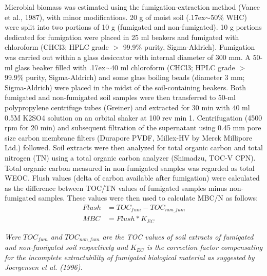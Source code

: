     	Microbial biomass was estimated using the fumigation-extraction method (Vance et al., 1987), with minor modifications. 20 g of moist soil ({\raise.17ex\hbox{$\scriptstyle\mathtt{\sim}$}}50\% WHC) were split into two portions of 10 g (fumigated and non-fumigated). 10 g portions dedicated for fumigation were placed in 25 ml beakers and fumigated with chloroform (CHCl3; HPLC grade $ > $ 99.9\% purity, Sigma-Aldrich). Fumigation was carried out within a glass desiccator with internal diameter of 300 mm. A 50-ml glass beaker filled with {\raise.17ex\hbox{$\scriptstyle\mathtt{\sim}$}}40 ml chloroform (CHCl3; HPLC grade $ > $ 99.9\% purity, Sigma-Aldrich) and some glass boiling beads (diameter 3 mm; Sigma-Aldrich) were placed in the midst of the soil-containing beakers.  Both fumigated and non-fumigated soil samples were then transferred to 50-ml polypropylene centrifuge tubes (Greiner) and extracted for 30 min with 40 ml 0.5M K2SO4 solution on an orbital shaker at 100 rev min 1. Centrifugation (4500 rpm for 20 min) and subsequent filtration of the supernatant using 0.45 mm pore size carbon membrane filters (Durapore PVDF, Millex-HV by Merck Millipore Ltd.) followed. Soil extracts were then analyzed for total organic carbon and total nitrogen (TN) using a total organic carbon analyzer (Shimadzu, TOC-V CPN). Total organic carbon measured in non-fumigated samples was regarded as total WEOC. Flush values (delta of carbon available after fumigation) were calculated as the difference between TOC/TN values of fumigated samples minus non-fumigated samples. These values were then used to calculate MBC/N as follows:\\


    	\begin{align}
    	Flush &= TOC_{fum} - TOC_{non\_fum}\\
    	MBC   &= Flush * K_{EC}
    	\end{align}

    	\begin{adjustwidth}{50pt}{50pt}
    		\begin{footnotesize}
    			\textit{Were $ TOC_{fum} $ and $ TOC_{non\_fum} $ are the TOC values of soil extracts of fumigated and non-fumigated soil respectively and $ K_{EC} $  is the correction factor compensating for the incomplete extractability of fumigated biological material as suggested by Joergensen et al. (1996).}\\
    		\end{footnotesize}
    	\end{adjustwidth}


